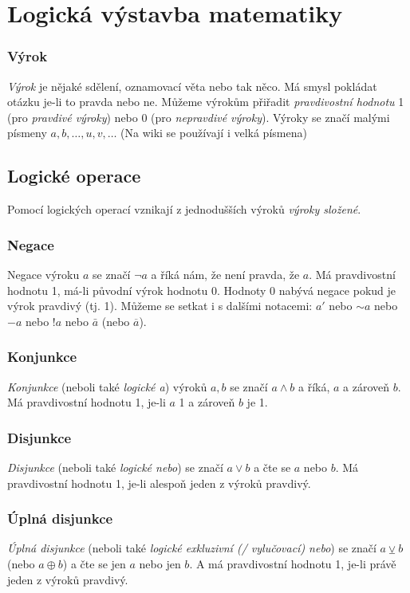 \documentclass[12pt]{article}
\providecommand{\lxor}{\veebar}
\begin{document}
\newpage
{}
\section{Logická výstavba matematiky}
\subsubsection{Výrok}
\emph{Výrok} je nějaké sdělení, oznamovací věta nebo tak něco. Má smysl pokládat otázku je-li to pravda nebo ne. Můžeme výrokům přiřadit \emph{pravdivostní hodnotu} 1 (pro \emph{pravdivé výroky}) nebo 0 (pro \emph{nepravdivé výroky}). Výroky se značí malými písmeny $a,b, \dotsc, u,v, \dotsc$ (Na wiki se používají i velká písmena)
\subsection{Logické operace}
Pomocí logických operací vznikají z jednodušších výroků \emph{výroky složené}.
\subsubsection{Negace}
Negace výroku $a$ se značí $\neg a$ a říká nám, že není pravda, že $a$. Má pravdivostní hodnotu 1, má-li původní výrok hodnotu 0. Hodnoty 0 nabývá negace pokud je výrok pravdivý (tj. 1). Můžeme se setkat i s dalšími notacemi: $a'$ nebo $\sim a$ nebo $-a$ nebo $!a$ nebo $\bar{a}$ (nebo $\overline{a}$).
\subsubsection{Konjunkce}
\emph{Konjunkce} (neboli také \emph{logické a}) výroků $a,b$ se značí $a \land b$ a říká, $a$ a zároveň $b$. Má pravdivostní hodnotu 1, je-li $a$ 1 a zároveň $b$ je 1.
\subsubsection{Disjunkce}
\emph{Disjunkce} (neboli také \emph{logické nebo}) se značí $a \lor b$ a čte se $a$ nebo $b$. Má pravdivostní hodnotu 1, je-li alespoň jeden z výroků pravdivý.
\subsubsection{Úplná disjunkce}
\emph{Úplná disjunkce} (neboli také \emph{logické exkluzivní (/ vylučovací) nebo}) se značí $a \lxor b$ (nebo $a \oplus b$) a čte se jen $a$ nebo jen $b$. A má pravdivostní hodnotu 1, je-li právě jeden z výroků pravdivý.
\end{document}
